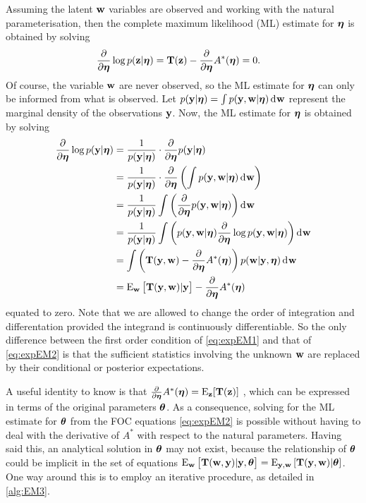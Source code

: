 Assuming the latent ${\mathbf w}$ variables are observed and working with the natural parameterisation, then the complete maximum likelihood (ML) estimate for ${\bm\eta}$ is obtained by solving 
\begin{align}\label{eq:expEM1}
  \frac{\partial}{\partial{\bm\eta}}\log p({\mathbf z}|{\bm\eta})
  &= {\mathbf T}({\mathbf z}) - \frac{\partial}{\partial{\bm\eta}} A^*({\bm\eta}) = 0.
\end{align}
Of course, the variable ${\mathbf w}$ are never observed, so the ML estimate for ${\bm\eta}$ can only be informed from what is observed.
Let $p({\mathbf y}|{\bm\eta}) = \int p({\mathbf y},{\mathbf w}|{\bm\eta}) \operatorname{d}\hspace{0.5pt}\! {\mathbf w}$ represent the marginal density of the observations ${\mathbf y}$.
Now, the ML estimate for ${\bm\eta}$  is obtained by solving
\begin{align}
  \frac{\partial}{\partial{\bm\eta}}\log p({\mathbf y}|{\bm\eta})
  &= \frac{1}{p({\mathbf y}|{\bm\eta})} \cdot \frac{\partial}{\partial{\bm\eta}}  p({\mathbf y}|{\bm\eta}) \nonumber \\
  &= \frac{1}{p({\mathbf y}|{\bm\eta})} \cdot \frac{\partial}{\partial{\bm\eta}} \left( \int p({\mathbf y},{\mathbf w}|{\bm\eta}) \operatorname{d}\hspace{0.5pt}\! {\mathbf w} \right) \nonumber \\
  &= \frac{1}{p({\mathbf y}|{\bm\eta})}  \int \left( \frac{\partial}{\partial{\bm\eta}} p({\mathbf y},{\mathbf w}|{\bm\eta}) \right) \operatorname{d}\hspace{0.5pt}\! {\mathbf w} \nonumber \\
  &= \frac{1}{p({\mathbf y}|{\bm\eta})}  \int \left( p({\mathbf y},{\mathbf w}|{\bm\eta}) \frac{\partial}{\partial{\bm\eta}} \log p({\mathbf y},{\mathbf w}|{\bm\eta}) \right) \operatorname{d}\hspace{0.5pt}\! {\mathbf w} \nonumber \\
  &= \int \left( {\mathbf T}({\mathbf y},{\mathbf w}) - \frac{\partial}{\partial{\bm\eta}} A^*({\bm\eta}) \right) p({\mathbf w}|{\mathbf y},{\bm\eta}) \operatorname{d}\hspace{0.5pt}\! {\mathbf w} \nonumber \\
  &= \operatorname{E}_{\mathbf w} \big[ {\mathbf T}({\mathbf y},{\mathbf w}) | {\mathbf y} \big] - \frac{\partial}{\partial{\bm\eta}} A^*({\bm\eta}) \label{eq:expEM2}
\end{align}
equated to zero.
Note that we are allowed to change the order of integration and differentation provided the integrand is continuously differentiable.
So the only difference between the first order condition of \cref{eq:expEM1} and that of \cref{eq:expEM2} is that the sufficient statistics involving the unknown ${\mathbf w}$ are replaced by their conditional or posterior expectations.

A useful identity to know is that $\frac{\partial}{\partial{\bm\eta}} A^*({\bm\eta}) = \operatorname{E}_{\mathbf z}[ {\mathbf T}({\mathbf z})]$ \citep[Thm. 3.4.2 \& Exer. 3.32(a)]{casella2002statistical}, which can be expressed in terms of the original parameters ${\bm\theta}$.
As a consequence, solving for the ML estimate for ${\bm\theta}$ from the FOC equations \cref{eq:expEM2} is possible without having to deal with the derivative of $A^*$ with respect to the natural parameters.
Having said this, an analytical solution in ${\bm\theta}$ may not exist, because the relationship of ${\bm\theta}$ could be implicit in the set of equations $\operatorname{E}_{\mathbf w} \big[ {\mathbf T}({\mathbf w},{\mathbf y}) | {\mathbf y}, {\bm\theta} \big] = \operatorname{E}_{{\mathbf y},{\mathbf w}}\left[ {\mathbf T}({\mathbf y},{\mathbf w}) | {\bm\theta} \right]$.
One way around this is to employ an iterative procedure, as detailed in \cref{alg:EM3}.

